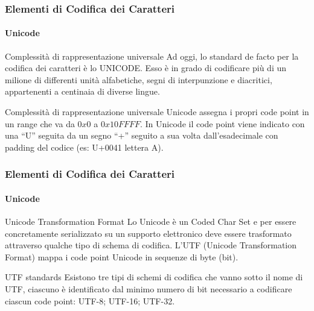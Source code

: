 \begin{frame}
	\frametitle{Elementi di Codifica dei Caratteri}
	\framesubtitle{Unicode}
	\addtocounter{nframe}{1}

	\begin{block}{Complessità di rappresentazione universale}
		Ad oggi, lo standard de facto per la codifica dei caratteri è lo UNICODE. Esso è in grado di codificare più di un milione di differenti unità alfabetiche, segni di interpunzione e diacritici, appartenenti a centinaia di diverse lingue.
	\end{block}

	\begin{block}{Complessità di rappresentazione universale}
		Unicode assegna i propri code point in un range che va da $0x0$ a $0x10FFFF$. In Unicode il code point viene  indicato con una ``U'' seguita da un segno ``+'' seguito a sua volta dall'esadecimale con padding del codice (es: U+0041 lettera A).
	\end{block}

\end{frame}

\begin{frame}
	\frametitle{Elementi di Codifica dei Caratteri}
	\framesubtitle{Unicode}
	\addtocounter{nframe}{1}

	\begin{block}{Unicode Transformation Format}
		Lo Unicode è un Coded Char Set e per essere concretamente serializzato su un supporto elettronico deve essere trasformato attraverso qualche tipo di schema di codifica.
		L'UTF (Unicode Transformation Format) mappa i code point Unicode in sequenze di byte (bit).
	\end{block}

	\begin{block}{UTF standards}
		Esistono tre tipi di schemi di codifica che vanno sotto il nome di UTF, ciascuno è identificato dal minimo numero di bit necessario a codificare ciascun code point: UTF-8; UTF-16; UTF-32. 
	\end{block}

\end{frame}


